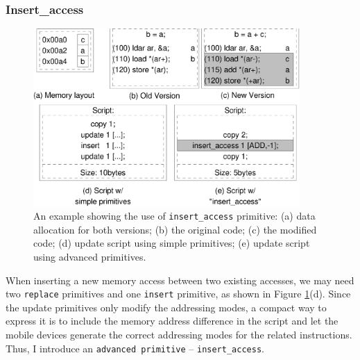 


\subsubsection{Insert\_access}


\begin{figure}[htbp]
\begin{center}
\includegraphics[width=4in]{./figures/insacc.eps}
\caption{An example showing the use of {\tt insert\_access} primitive:
(a) data allocation for both versions;
(b) the original code;
(c) the modified code;
(d) update script using simple primitives;
(e) update script using advanced primitives.
}
\label{insacc}
\end{center}
\end{figure}
	
When inserting a new memory access between two existing accesses, we may need two {\tt replace} primitives and one {\tt insert} primitive, as shown in Figure \ref{insacc}(d). Since the update primitives only modify the addressing modes, a compact way to express it is to include the memory address difference in the script and let the mobile devices generate the correct addressing modes for the related instructions. Thus, I introduce an {\tt advanced primitive} -- {\tt insert\_access}.

